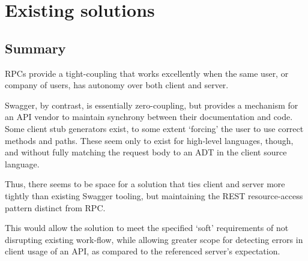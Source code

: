 \section{Existing solutions} \label{soln}





\subsection{Summary} \label{soln:summary}
RPCs provide a tight-coupling that works excellently when the same user, or company of users, has autonomy over both client and server.

Swagger, by contrast, is essentially zero-coupling, but provides a mechanism for an API vendor to maintain synchrony between their documentation and code. Some client stub generators exist, to some extent `forcing' the user to use correct methods and paths. These seem only to exist for high-level languages, though, and without fully matching the request body to an ADT in the client source language. \cite{swagger_oss}

Thus, there seems to be space for a solution that ties client and server more tightly than existing Swagger tooling, but maintaining the REST resource-access pattern distinct from RPC.

This would allow the solution to meet the specified `soft' requirements  of not disrupting existing work-flow, while allowing greater scope for detecting errors in client usage of an API, as compared to the referenced server's expectation.
